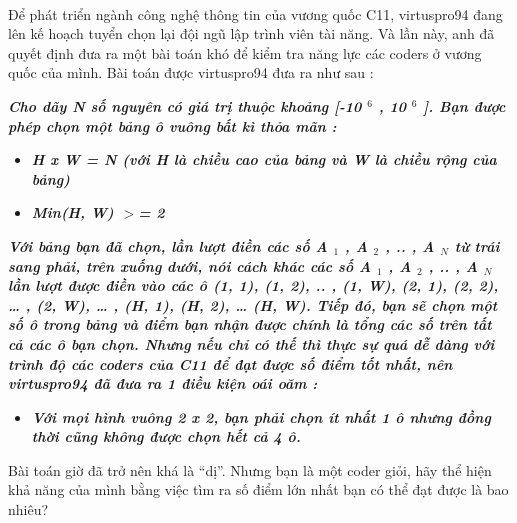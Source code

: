  

Để phát triển ngành công nghệ thông tin của vương quốc C11, virtuspro94 đang lên kế hoạch tuyển chọn lại đội ngũ lập trình viên tài năng. Và lần này, anh đã quyết định đưa ra một bài toán khó để kiểm tra năng lực các coders ở vương quốc của mình. Bài toán được virtuspro94 đưa ra như sau :

\emph{\textbf{Cho dãy N số nguyên có giá trị thuộc khoảng [-10 $^ 6 $ , 10 $^ 6 $ ]. Bạn được phép chọn một bảng ô vuông bất kì thỏa mãn : }}
\begin{itemize}
	\item \emph{\textbf{H x W = N (với H là chiều cao của bảng và W là chiều rộng của bảng) }}
	\item \emph{\textbf{Min(H, W) $>$= 2 }}
\end{itemize}

\emph{\textbf{Với bảng bạn đã chọn, lần lượt điền các số A $_ 1 $ , A $_ 2 $ , .. , A $_ N $ từ trái sang phải, trên xuống dưới, nói cách khác các số A $_ 1 $ , A $_ 2 $ , .. , A $_ N $ lần lượt được điền vào các ô (1, 1), (1, 2), .. , (1, W), (2, 1), (2, 2), … , (2, W), … , (H, 1), (H, 2), … (H, W). Tiếp đó, bạn sẽ chọn một số ô trong bảng và điểm bạn nhận được chính là tổng các số trên tất cả các ô bạn chọn. Nhưng nếu chỉ có thế thì thực sự quá dễ dàng với trình độ các coders của C11 để đạt được số điểm tốt nhất, nên virtuspro94 đã đưa ra 1 điều kiện oái oăm : }}
\begin{itemize}
	\item \emph{\textbf{Với mọi hình vuông 2 x 2, bạn phải chọn ít nhất 1 ô nhưng đồng thời cũng không được chọn hết cả 4 ô. }}
\end{itemize}

Bài toán giờ đã trở nên khá là “dị”. Nhưng bạn là một coder giỏi, hãy thể hiện khả năng của mình bằng việc tìm ra số điểm lớn nhất bạn có thể đạt được là bao nhiêu?
